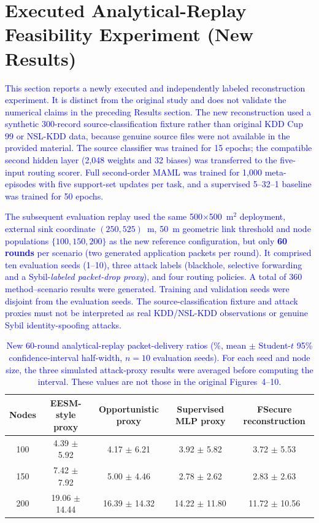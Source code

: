 \documentclass[pdflatex,sn-mathphys-num]{sn-jnl}
\newcommand{\Revised}[1]{\textcolor{blue}{#1}}
\begin{document}
\section{Executed Analytical-Replay Feasibility Experiment (New Results)}
\label{app:executed_60rounds}
\Revised{This section reports a newly executed and independently labeled reconstruction experiment. It is distinct from the original study and does not validate the numerical claims in the preceding Results section. The new reconstruction used a synthetic 300-record source-classification fixture rather than original KDD Cup 99 or NSL-KDD data, because genuine source files were not available in the provided material. The source classifier was trained for 15 epochs; the compatible second hidden layer (2,048 weights and 32 biases) was transferred to the five-input routing scorer. Full second-order MAML was trained for 1,000 meta-episodes with five support-set updates per task, and a supervised 5--32--1 baseline was trained for 50 epochs.}

\Revised{The subsequent evaluation replay used the same 500$\times$500~m$^2$ deployment, external sink coordinate $(250,525)$~m, 50~m geometric link threshold and node populations $\{100,150,200\}$ as the new reference configuration, but only \textbf{60 rounds} per scenario (two generated application packets per round). It comprised ten evaluation seeds (1--10), three attack labels (blackhole, selective forwarding and a Sybil-\emph{labeled packet-drop proxy}), and four routing policies. A total of 360 method--scenario results were generated. Training and validation seeds were disjoint from the evaluation seeds. The source-classification fixture and attack proxies must not be interpreted as real KDD/NSL-KDD observations or genuine Sybil identity-spoofing attacks.}

\begin{table}[ht]
\centering\scriptsize
\caption{\Revised{New 60-round analytical-replay packet-delivery ratios (\%, mean $\pm$ Student-$t$ 95\% confidence-interval half-width, $n=10$ evaluation seeds). For each seed and node size, the three simulated attack-proxy results were averaged before computing the interval. These values are not those in the original Figures~4--10.}}
\label{tab:new_executed_pdr}
\begin{tabular}{ccccc}
\toprule
Nodes & EESM-style proxy & Opportunistic proxy & Supervised MLP proxy & FSecure reconstruction\\
\midrule
100 & 4.39 $\pm$ 5.92 & 4.17 $\pm$ 6.21 & 3.92 $\pm$ 5.82 & 3.72 $\pm$ 5.53 \\
150 & 7.42 $\pm$ 7.92 & 5.00 $\pm$ 4.46 & 2.78 $\pm$ 2.62 & 2.83 $\pm$ 2.63 \\
200 & 19.06 $\pm$ 14.44 & 16.39 $\pm$ 14.32 & 14.22 $\pm$ 11.80 & 11.72 $\pm$ 10.56 \\
\bottomrule
\end{tabular}
\end{table}
\end{document}
